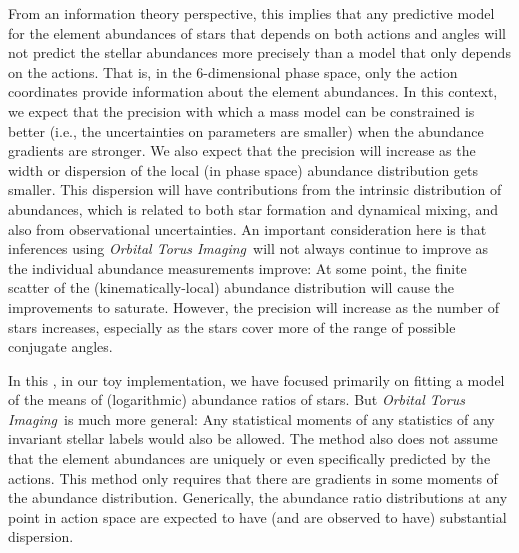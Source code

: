 \documentclass[modern]{aastex63}
\newcommand{\methodname}{\textsl{Orbital Torus Imaging}}
\begin{document}
From an information theory perspective, this implies that any predictive model
for the element abundances of stars that depends on both actions and angles will
not predict the stellar abundances more precisely than a model that only depends
on the actions.
That is, in the 6-dimensional phase space, only the action coordinates provide
information about the element abundances.
In this context, we expect that the precision with which a mass model can be
constrained is better (i.e., the uncertainties on parameters are smaller) when
the abundance gradients are stronger.
We also expect that the precision will increase as the width or dispersion of
the local (in phase space) abundance distribution gets smaller.
This dispersion will have contributions from the intrinsic distribution of
abundances, which is related to both star formation and dynamical mixing, and
also from observational uncertainties.
An important consideration here is that inferences using \methodname\ will not
always continue to improve as the individual abundance measurements improve:
At some point, the finite scatter of the (kinematically-local) abundance
distribution will cause the improvements to saturate.
However, the precision will increase as the number of stars increases,
especially as the stars cover more of the range of possible conjugate angles.

In this \documentname, in our toy implementation, we have focused primarily on
fitting a model of the means of (logarithmic) abundance ratios of stars.
But \methodname\ is much more general:
Any statistical moments of any statistics of any invariant stellar labels would
also be allowed.
The method also does not assume that the element abundances are uniquely or even
specifically predicted by the actions.
This method only requires that there are gradients in some moments of the
abundance distribution.
Generically, the abundance ratio distributions at any point in action space are
expected to have (and are observed to have) substantial dispersion.
\end{document}
